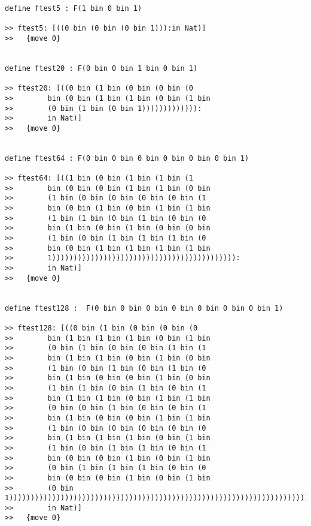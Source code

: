 \documentclass{article}
\begin{document}
\begin{verbatim}
define ftest5 : F(1 bin 0 bin 1)

>> ftest5: [((0 bin (0 bin (0 bin 1))):in Nat)]
>>   {move 0}


define ftest20 : F(0 bin 0 bin 1 bin 0 bin 1)

>> ftest20: [((0 bin (1 bin (0 bin (0 bin (0 
>>        bin (0 bin (1 bin (1 bin (0 bin (1 bin 
>>        (0 bin (1 bin (0 bin 1))))))))))))):
>>        in Nat)]
>>   {move 0}


define ftest64 : F(0 bin 0 bin 0 bin 0 bin 0 bin 0 bin 1)

>> ftest64: [((1 bin (0 bin (1 bin (1 bin (1 
>>        bin (0 bin (0 bin (1 bin (1 bin (0 bin 
>>        (1 bin (0 bin (0 bin (0 bin (0 bin (1 
>>        bin (0 bin (1 bin (0 bin (1 bin (1 bin 
>>        (1 bin (1 bin (0 bin (1 bin (0 bin (0 
>>        bin (1 bin (0 bin (1 bin (0 bin (0 bin 
>>        (1 bin (0 bin (1 bin (1 bin (1 bin (0 
>>        bin (0 bin (1 bin (1 bin (1 bin (1 bin 
>>        1))))))))))))))))))))))))))))))))))))))))))):
>>        in Nat)]
>>   {move 0}


define ftest128 :  F(0 bin 0 bin 0 bin 0 bin 0 bin 0 bin 0 bin 1)

>> ftest128: [((0 bin (1 bin (0 bin (0 bin (0 
>>        bin (1 bin (1 bin (1 bin (0 bin (1 bin 
>>        (0 bin (1 bin (0 bin (0 bin (1 bin (1 
>>        bin (1 bin (1 bin (0 bin (1 bin (0 bin 
>>        (1 bin (0 bin (1 bin (0 bin (1 bin (0 
>>        bin (1 bin (0 bin (0 bin (1 bin (0 bin 
>>        (1 bin (1 bin (0 bin (1 bin (0 bin (1 
>>        bin (1 bin (1 bin (0 bin (1 bin (1 bin 
>>        (0 bin (0 bin (1 bin (0 bin (0 bin (1 
>>        bin (1 bin (0 bin (0 bin (1 bin (1 bin 
>>        (1 bin (0 bin (0 bin (0 bin (0 bin (0 
>>        bin (1 bin (1 bin (1 bin (0 bin (1 bin 
>>        (1 bin (0 bin (1 bin (1 bin (0 bin (1 
>>        bin (0 bin (0 bin (1 bin (0 bin (1 bin 
>>        (0 bin (1 bin (1 bin (1 bin (0 bin (0 
>>        bin (0 bin (0 bin (1 bin (0 bin (1 bin 
>>        (0 bin 1)))))))))))))))))))))))))))))))))))))))))))))))))))))))))))))))))))))))))))))))))))))))):
>>        in Nat)]
>>   {move 0}


\end{verbatim}
\end{document}
